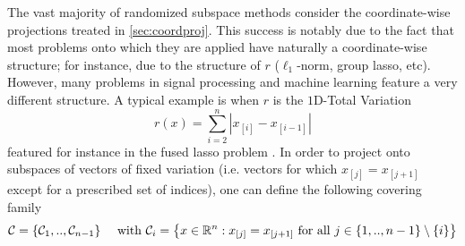 The vast majority of randomized subspace methods consider the coordinate-wise projections treated in \ref{sec:coordproj}. This success is notably due to the fact that most problems onto which they are applied have naturally a coordinate-wise structure; for instance, due to the structure of $r$ ($\ell_1$-norm, group lasso, etc). However, many problems in signal processing and machine learning feature a very different structure. A typical example is when $r$ is the $1$D-Total Variation 
\begin{equation}\label{eq:TV}
    r(x) = \sum_{i=2}^n |x_{[i]}-x_{[i-1]}|
\end{equation}
featured for instance in the fused lasso problem \cite{tibshirani2005sparsity}. In order to project onto subspaces of vectors of fixed variation (i.e. vectors for which $x_{[j]} = x_{[j+1]}$ except for a prescribed set of indices), one can define the following covering family 
{
$$ \mathcal{C} = \{\mathcal{C}_1,..,\mathcal{C}_{n-1}\} \quad\text{ with } \mathcal{C}_i = \left\{x\in\mathbb{R}^n  : x_{[j]} = x_{[j+1]} \text{ for all } j\in \{1,..,n-1\}\setminus\{i\}  \right\} $$ }

